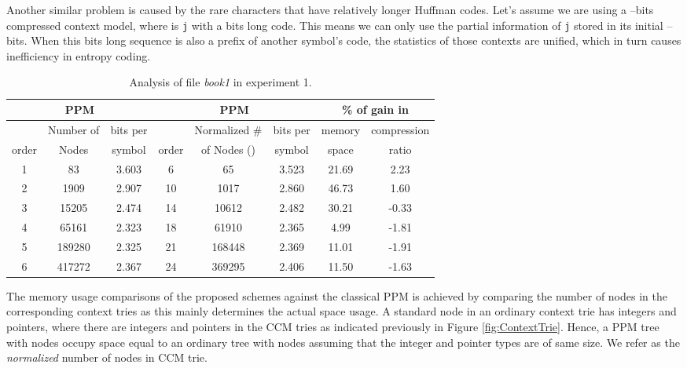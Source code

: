 \documentclass[runningheads,a4paper]{llncs}
\begin{document}
Another similar problem is caused by the rare characters that have relatively longer Huffman codes. 
Let's assume we are using a --bits compressed context model, where  is \texttt{j} with a  bits long
code. This means we can only use the partial information of \texttt{j} stored in its initial --bits. 
When this  bits long sequence is also a prefix of another symbol's code, the statistics of those contexts are
unified, which in turn causes inefficiency in entropy coding. 

\begin{table}
\begin{center}
\begin{tabular}{c|c|c||c|c|c||c|c|}
\multicolumn{3}{c||}{PPM} &  \multicolumn{3}{c||}{PPM} & \multicolumn{2}{c}{\% of gain in} \\ \hline
      & Number of &  bits per   &         & Normalized \#            &  bits per &  memory     &
\multicolumn{1}{|c|}{compression} \\
order & Nodes     &  symbol & order   & of Nodes () &   symbol &  space  &   
\multicolumn{1}{|c|}{ratio} \\ \hline 
1 & 83     & 3.603 & 6  & 65      & 3.523 & 21.69 & 2.23 \\
2 & 1909   & 2.907 & 10 & 1017    & 2.860 & 46.73 & 1.60 \\
3 & 15205  & 2.474 & 14 & 10612   & 2.482 & 30.21 & -0.33 \\
4 & 65161  & 2.323 & 18 & 61910   & 2.365 & 4.99  & -1.81 \\
5 & 189280 & 2.325 & 21 & 168448  & 2.369 & 11.01 & -1.91 \\
6 & 417272 & 2.367 & 24 & 369295  & 2.406 & 11.50 & -1.63 \\
\end{tabular}
\end{center}
\caption{Analysis of file \emph{book1} in experiment 1.}
\label{tab:experiment1book1}
\end{table} 


The memory usage comparisons of the proposed schemes against the classical {PPM} is achieved by comparing the number of
nodes in the corresponding context tries as this mainly determines the actual space usage. 
A standard node in an ordinary context trie has  integers and  pointers, where there are
 integers and  pointers in the CCM tries as indicated previously in Figure \ref{fig:ContextTrie}. 
Hence, a PPM tree with  nodes occupy space equal to an ordinary tree with  nodes assuming that the integer and pointer types are of same size. 
We refer  as the \emph{normalized} number of nodes in CCM trie. 
\end{document}
